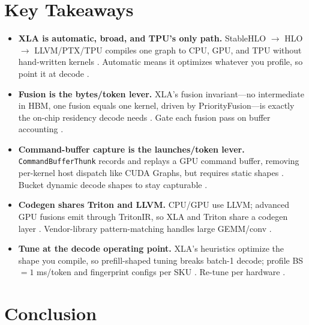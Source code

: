 \section{Key Takeaways}
\label{sec:ch15_key_takeaways}

\begin{itemize}
\item \textbf{XLA is automatic, broad, and TPU's only path.}
StableHLO $\to$ HLO $\to$ LLVM/PTX/TPU compiles one graph to CPU, GPU, and TPU without hand-written kernels \citep{openxla2024,lai2023relax}. Automatic means it optimizes whatever you profile, so point it at decode \citep{patel2025llminference}.

\item \textbf{Fusion is the bytes/token lever.}
XLA's fusion invariant---no intermediate in HBM, one fusion equals one kernel, driven by PriorityFusion---is exactly the on-chip residency decode needs \citep{openxla2024,memoryfloor2026}. Gate each fusion pass on buffer accounting \citep{taxbreak2026}.

\item \textbf{Command-buffer capture is the launches/token lever.}
\texttt{CommandBufferThunk} records and replays a GPU command buffer, removing per-kernel host dispatch like CUDA Graphs, but requires static shapes \citep{openxla2024,nvidia2024cudagraphs}. Bucket dynamic decode shapes to stay capturable \citep{kwon2023vllm}.

\item \textbf{Codegen shares Triton and LLVM.}
CPU/GPU use LLVM; advanced GPU fusions emit through TritonIR, so XLA and Triton share a codegen layer \citep{openxla2024,tillet2019triton}. Vendor-library pattern-matching handles large GEMM/conv \citep{nvidia2022hopper}.

\item \textbf{Tune at the decode operating point.}
XLA's heuristics optimize the shape you compile, so prefill-shaped tuning breaks batch-1 decode; profile BS${=}1$ ms/token and fingerprint configs per SKU \citep{patel2025llminference,openxla2024}. Re-tune per hardware \citep{nvidia2022hopper}.
\end{itemize}

\section{Conclusion}
\label{sec:ch15_conclusion}

